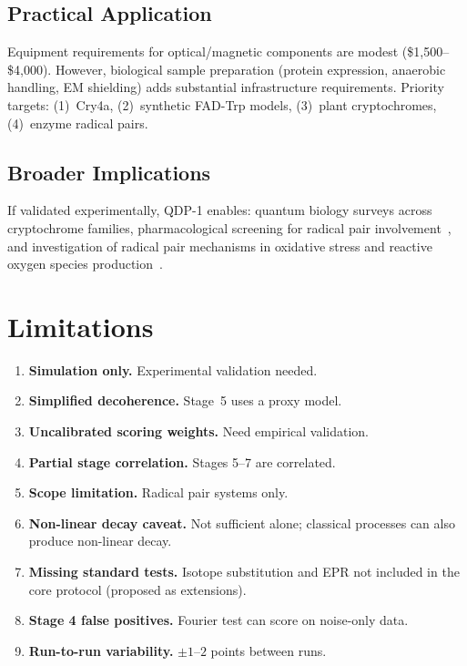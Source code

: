 \documentclass[preprint,amsmath,amssymb]{revtex4-2}
\begin{document}
\subsection{Practical Application}

Equipment requirements for optical/magnetic components are modest (\$1,500--\$4,000). However, biological sample preparation (protein expression, anaerobic handling, EM shielding) adds substantial infrastructure requirements. Priority targets: (1)~Cry4a, (2)~synthetic FAD-Trp models, (3)~plant cryptochromes, (4)~enzyme radical pairs.

\subsection{Broader Implications}

If validated experimentally, QDP-1 enables: quantum biology surveys across cryptochrome families, pharmacological screening for radical pair involvement~\cite{zadeh2022}, and investigation of radical pair mechanisms in oxidative stress and reactive oxygen species production~\cite{hore2025}.

\section{Limitations}

\begin{enumerate}
\item \textbf{Simulation only.} Experimental validation needed.
\item \textbf{Simplified decoherence.} Stage~5 uses a proxy model.
\item \textbf{Uncalibrated scoring weights.} Need empirical validation.
\item \textbf{Partial stage correlation.} Stages 5--7 are correlated.
\item \textbf{Scope limitation.} Radical pair systems only.
\item \textbf{Non-linear decay caveat.} Not sufficient alone; classical processes can also produce non-linear decay.
\item \textbf{Missing standard tests.} Isotope substitution and EPR not included in the core protocol (proposed as extensions).
\item \textbf{Stage 4 false positives.} Fourier test can score on noise-only data.
\item \textbf{Run-to-run variability.} $\pm 1$--$2$ points between runs.
\end{enumerate}
\end{document}
